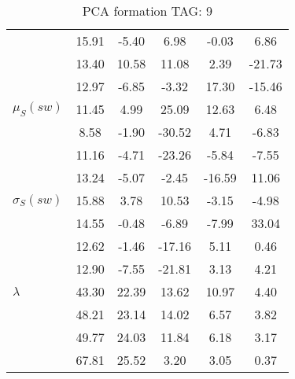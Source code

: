 \begin{table}[h!]
\begin{center}
\begin{tabular}{| l || c | c | c | c | c |}
 & 15.91  & -5.40  & 6.98  & -0.03  & 6.86 \\
 & 13.40  & 10.58  & 11.08  & 2.39  & -21.73 \\
 & 12.97  & -6.85  & -3.32  & 17.30  & -15.46 \\\hline
$\mu_S(sw)$ & 11.45  & 4.99  & 25.09  & 12.63  & 6.48 \\
 & 8.58  & -1.90  & -30.52  & 4.71  & -6.83 \\
 & 11.16  & -4.71  & -23.26  & -5.84  & -7.55 \\
 & 13.24  & -5.07  & -2.45  & -16.59  & 11.06 \\\hline
$\sigma_S(sw)$ & 15.88  & 3.78  & 10.53  & -3.15  & -4.98 \\
 & 14.55  & -0.48  & -6.89  & -7.99  & 33.04 \\
 & 12.62  & -1.46  & -17.16  & 5.11  & 0.46 \\
 & 12.90  & -7.55  & -21.81  & 3.13  & 4.21 \\\hline\hline
$\lambda$ & 43.30  & 22.39  & 13.62  & 10.97  & 4.40 \\
 & 48.21  & 23.14  & 14.02  & 6.57  & 3.82 \\
 & 49.77  & 24.03  & 11.84  & 6.18  & 3.17 \\
 & 67.81  & 25.52  & 3.20  & 3.05  & 0.37 \\\hline
\end{tabular}
\caption{PCA formation TAG: 9}
\end{center}
\end{table}